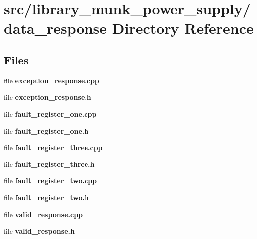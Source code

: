 \section{src/library\+\_\+munk\+\_\+power\+\_\+supply/data\+\_\+response Directory Reference}
\label{dir_c6139b5c40fb5e336b47692b11ff925a}
\subsection*{Files}
\begin{DoxyCompactItemize}
\item 
file \textbf{ exception\+\_\+response.\+cpp}
\item 
file \textbf{ exception\+\_\+response.\+h}
\item 
file \textbf{ fault\+\_\+register\+\_\+one.\+cpp}
\item 
file \textbf{ fault\+\_\+register\+\_\+one.\+h}
\item 
file \textbf{ fault\+\_\+register\+\_\+three.\+cpp}
\item 
file \textbf{ fault\+\_\+register\+\_\+three.\+h}
\item 
file \textbf{ fault\+\_\+register\+\_\+two.\+cpp}
\item 
file \textbf{ fault\+\_\+register\+\_\+two.\+h}
\item 
file \textbf{ valid\+\_\+response.\+cpp}
\item 
file \textbf{ valid\+\_\+response.\+h}
\end{DoxyCompactItemize}
